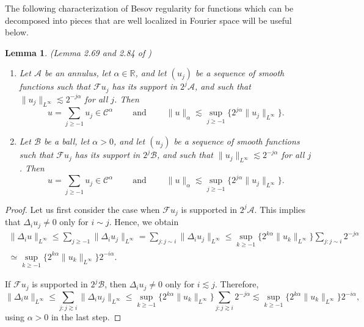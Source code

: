 \documentclass[11pt,a4paper]{article}
\newcommand{\tmop}[1]{\ensuremath{\operatorname{#1}}}
\newenvironment{enumeratenumeric}{\begin{enumerate}[1.] }{\end{enumerate}}
\newtheorem{lemma}[theorem]{Lemma}
\theoremstyle{remark}
\newcommand{\CA}{\ensuremath{\mathscr{A}}}
\newcommand{\CB}{\ensuremath{\mathscr{B}}}
\newcommand{\CC}{\ensuremath{\mathscr{C}}}
\newcommand{\CF}{\ensuremath{\mathscr{F}}}
\begin{document}
The following characterization of Besov regularity for functions which can be decomposed into pieces that are well localized in Fourier space will be useful below.

\begin{lemma}\label{lem: Besov regularity of series}(Lemma 2.69 and 2.84 of {\cite{Bahouri2011}})
   \begin{enumeratenumeric}
      \item Let $\CA$ be an annulus, let $\alpha \in \mathbb{R}$, and let $(u_{j})$ be a sequence of smooth functions such that $\CF u_{j}$ has its support in $2^{j} \CA$, and such that $\| u_{j} \|_{L^{\infty}} \lesssim 2^{-j \alpha}$ for all $j$. Then
         \[
            u= \sum_{j \geqslant -1} u_{j} \in \CC^{\alpha} \qquad  \tmop{and} \qquad \| u \|_{\alpha} \lesssim \sup_{j \geqslant -1} \{ 2^{j \alpha} \| u_{j} \|_{L^{\infty}} \} .
         \]
      \item Let $\CB$ be a ball, let $\alpha >0$, and let $( u_{j} )$ be a sequence of smooth functions such that $\CF u_{j}$ has its support in $2^{j} \CB$, and such that $\| u_{j} \|_{L^{\infty}} \lesssim 2^{-j \alpha}$ for all $j$. Then
         \[
            u= \sum_{j \geqslant -1} u_{j} \in \CC^{\alpha} \qquad \tmop{and} \qquad \| u \|_{\alpha} \lesssim \sup_{j \geqslant -1} \{ 2^{j \alpha} \| u_{j} \|_{L^{\infty}} \} .
         \]
   \end{enumeratenumeric}
\end{lemma}

\begin{proof}
  Let us first consider the case when $\CF u_{j}$ is supported in $2^{j} \CA$. This implies that $\Delta_{i} u_{j} \neq 0$ only for $i \sim j$. Hence, we obtain
  \begin{gather*}
     \| \Delta_{i} u \|_{L^{\infty}} \leqslant \sum_{j \geqslant -1} \| \Delta_{i} u_{j} \|_{L^{\infty}} = \sum_{j:j \sim i} \| \Delta_{i} u_{j} \|_{L^{\infty}} \leqslant \sup_{k \geqslant -1} \{ 2^{k \alpha} \| u_{k} \|_{L^{\infty}} \} \sum_{j:j \sim i} 2^{-j  \alpha} \\
     \simeq \sup_{k \geqslant -1} \{ 2^{k \alpha} \| u_{k} \|_{L^{\infty}} \} 2^{-i \alpha}.
  \end{gather*}
  
   If $\CF u_{j}$ is supported in $2^{j} \CB$, then $\Delta_{i} u_{j} \neq 0$ only for $i \lesssim j$. Therefore,
   \[
      \| \Delta_{i} u \|_{L^{\infty}} \leqslant \sum_{j:j \gtrsim i} \| \Delta_{i} u_{j} \|_{L^{\infty}} \leqslant \sup_{k \geqslant -1} \{ 2^{k \alpha} \| u_{k} \|_{L^{\infty}} \} \sum_{j:j \gtrsim i} 2^{-j  \alpha}  \lesssim \sup_{k \geqslant -1} \{ 2^{k \alpha} \| u_{k} \|_{L^{\infty}} \} 2^{-i \alpha},
   \]
   using $\alpha >0$ in the last step.
\end{proof}
\end{document}

